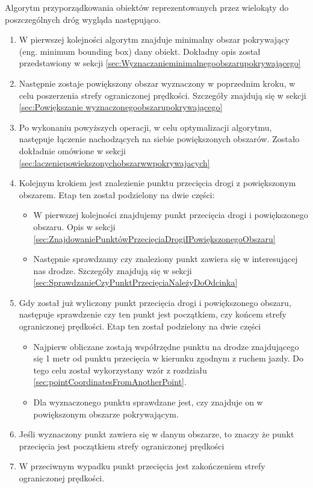 Algorytm przyporządkowania obiektów reprezentowanych przez wielokąty do poszczególnych dróg wygląda następująco.
\begin{enumerate}
\item W pierwszej kolejności algorytm znajduje minimalny obszar pokrywający (eng. minimum bounding box) dany obiekt. Dokładny opis został przedstawiony w sekcji \ref{sec:Wyznaczanieminimalnegoobszarupokrywającego}
\item Następnie zostaje powiększony obszar wyznaczony w poprzednim kroku, w celu poszerzenia strefy ograniczonej prędkości. Szczegóły znajdują się w sekcji \ref{sec:Powiększanie wyznaczonegoobszarupokrywającego}
\item Po wykonaniu powyższych operacji, w celu optymalizacji algorytmu, następuje łączenie nachodzących na siebie powiększonych obszarów.  Zostało dokładnie omówione w sekcji \ref{sec:laczeniepowiekszonychobszarwwpokrywajacych}
\item Kolejnym krokiem jest znalezienie punktu przecięcia drogi z powiększonym obszarem. Etap ten został podzielony na dwie części:
\begin{itemize}
\item W pierwszej kolejności znajdujemy punkt przecięcia drogi i powiększonego obszaru. Opis w sekcji \ref{sec:ZnajdowaniePunktówPrzecięciaDrogiIPowiększonegoObszaru}
\item Następnie sprawdzamy czy znaleziony punkt zawiera się w interesującej nas drodze. Szczegóły znajdują się w sekcji \ref{sec:SprawdzanieCzyPunktPrzecięciaNależyDoOdcinka}
\end{itemize}
\item Gdy został już wyliczony punkt przecięcia drogi i powiększonego obszaru, następuje sprawdzenie czy ten punkt jest początkiem, czy końcem strefy ograniczonej prędkości. Etap ten został podzielony na dwie części
\begin{itemize}
\item Najpierw obliczane zostają współrzędne punktu na drodze znajdującego się 1 metr od punktu przecięcia w kierunku zgodnym z ruchem jazdy. Do tego celu został wykorzystany wzór z rozdziału \ref{sec:pointCoordinatesFromAnotherPoint}.
\item Dla wyznaczonego punktu sprawdzane jest, czy znajduje on w powiększonym obszarze pokrywającym.
\end{itemize}
\item Jeśli wyznaczony punkt zawiera się w danym obszarze, to znaczy że punkt przecięcia jest początkiem strefy ograniczonej prędkości
\item W przeciwnym wypadku punkt przecięcia jest zakończeniem strefy ograniczonej prędkości.
\end{enumerate}

